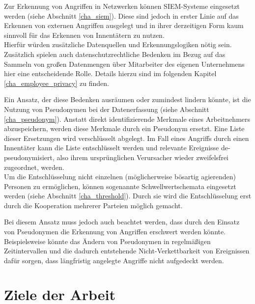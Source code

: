 Zur Erkennung von Angriffen in Netzwerken können SIEM-Systeme eingesetzt werden (siehe Abschnitt \ref{cha_siem}). Diese sind jedoch in erster Linie auf das Erkennen von externen Angriffen ausgelegt und in ihrer derzeitigen Form kaum sinnvoll für das Erkennen von Innentätern zu nutzen.  \\
Hierfür würden zusätzliche Datenquellen und Erkennungslogiken nötig sein. 
Zusätzlich spielen auch  datenschutzrechtliche Bedenken im Bezug auf das Sammeln von großen Datenmengen über Mitarbeiter des eigenen Unternehmens hier eine entscheidende Rolle. Details hierzu sind im folgenden Kapitel \ref{cha_employee_privacy} zu finden.

Ein Ansatz, der diese Bedenken ausräumen oder zumindest lindern könnte, ist die Nutzung von Pseudonymen bei der Datenerfassung (siehe Abschnitt \ref{cha_pseudonym}). Anstatt direkt identifizierende Merkmale eines Arbeitnehmers abzuspeichern, werden diese Merkmale durch ein Pseudonym ersetzt. Eine Liste dieser Ersetzungen wird verschlüsselt abgelegt. Im Fall eines Angriffs durch einen Innentäter kann die Liste entschlüsselt werden und relevante Ereignisse de-pseudonymisiert, also ihrem ursprünglichen Verursacher wieder zweifelsfrei zugeordnet, werden.\\
Um die Entschlüsselung nicht einzelnen (möglicherweise bösartig agierenden) Personen zu ermöglichen, können sogenannte Schwellwertschemata eingesetzt werden (siehe Abschnitt \ref{cha_threshold}). Durch sie wird die Entschlüsselung erst durch die Kooperation mehrerer Parteien möglich gemacht.

Bei diesem Ansatz muss jedoch auch beachtet werden, dass durch den Einsatz von Pseudonymen die Erkennung von Angriffen erschwert werden könnte. Beispielsweise könnte das Ändern von Pseudonymen in regelmäßigen Zeitintervallen und die dadurch entstehende Nicht-Verkettbarkeit von Ereignissen dafür sorgen, dass längfristig angelegte Angriffe nicht aufgedeckt werden.

\section*{Ziele der Arbeit}



